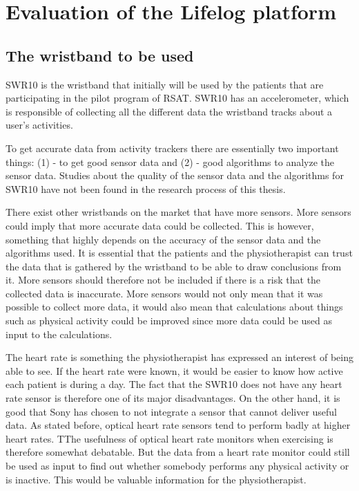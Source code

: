 \documentclass{cslthse-msc}
\begin{document}
\section{Evaluation of the Lifelog platform}
\label{sec:utLifelog}

\subsection{The wristband to be used}
SWR10 is the wristband that initially will be used by the patients that are participating in the pilot program of RSAT. SWR10 has an accelerometer, which is responsible of collecting all the different data the wristband tracks about a user’s activities.

To get accurate data from activity trackers there are essentially two important things: (1) - to get good sensor data and (2) - good algorithms to analyze the sensor data. Studies about the quality of the sensor data and the algorithms for SWR10 have not been found in the research process of this thesis.   

There exist other wristbands on the market that have more sensors. More sensors could imply that more accurate data could be collected. This is however, something that highly depends on the accuracy of the sensor data and the algorithms used. It is essential that the patients and the physiotherapist can trust the data that is gathered by the wristband to be able to draw conclusions from it. More sensors should therefore not be included if there is a risk that the collected data is inaccurate. More sensors would not only mean that it was possible to collect more data, it would also mean that calculations about things such as physical activity could be improved since more data could be used as input to the calculations. %


The heart rate is something the physiotherapist has expressed an interest of being able to see. If the heart rate were known, it would be easier to know how active each patient is during a day. The fact that the SWR10 does not have any heart rate sensor is therefore one of its major disadvantages. On the other hand, it is good that Sony has chosen to not integrate a sensor that cannot deliver useful data. As stated before, optical heart rate sensors tend to perform badly at higher heart rates. TThe usefulness of optical heart rate monitors when exercising is therefore somewhat debatable. But the data from a heart rate monitor could still be used as input to find out whether somebody performs any physical activity or is inactive. This would be valuable information for the physiotherapist.
\end{document}
